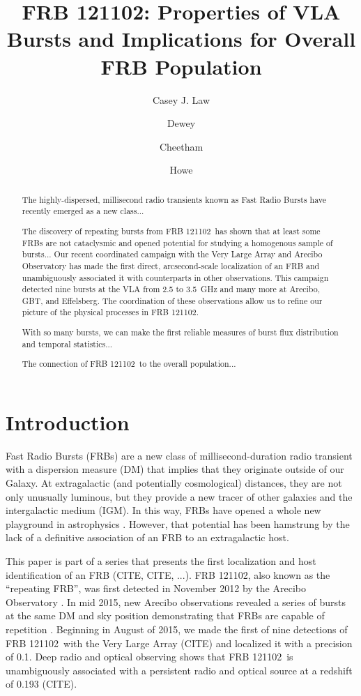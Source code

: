 \documentclass{emulateapj}
\newcommand{\frb}{FRB 121102}
\begin{document}
\title{\frb: Properties of VLA Bursts and Implications for Overall FRB Population}
\shorttitle{\frb\ Burst Properties}

\author{Casey J. Law}
\author{Dewey}
\author{Cheetham}\author{Howe}

\begin{abstract}
The highly-dispersed, millisecond radio transients known as Fast Radio Bursts have recently emerged as a new class...

The discovery of repeating bursts from \frb\ has shown that at least some FRBs are not cataclysmic and opened potential for studying a homogenous sample of bursts...
Our recent coordinated campaign with the Very Large Array and Arecibo Observatory has made the first direct, arcsecond-scale localization of an FRB and unambiguously associated it with counterparts in other observations. This campaign detected nine bursts at the VLA from 2.5 to 3.5~GHz and many more at Arecibo, GBT, and Effelsberg. The coordination of these observations allow us to refine our picture of the physical processes in \frb.

With so many bursts, we can make the first reliable measures of burst flux distribution and temporal statistics...

The connection of \frb\ to the overall population...

\end{abstract}

\section{Introduction}
Fast Radio Bursts (FRBs) are a new class of millisecond-duration radio transient with a dispersion measure (DM) that implies that they originate outside of our Galaxy. At extragalactic (and potentially cosmological) distances, they are not only unusually luminous, but they provide a new tracer of other galaxies and the intergalactic medium (IGM). In this way, FRBs have opened a whole new playground in astrophysics \citep[e.g.,][]{2014A&A...562A.137F, 2014ApJ...780L..33M, 2016MNRAS.457..232C}. However, that potential has been hamstrung by the lack of a definitive association of an FRB to an extragalactic host.

This paper is part of a series that presents the first localization and host identification of an FRB (CITE, CITE, ...). \frb, also known as the ``repeating FRB'', was first detected in November 2012 by the Arecibo Observatory \citep{2014ApJ...790..101S}. In mid 2015, new Arecibo observations revealed a series of bursts at the same DM and sky position demonstrating that FRBs are capable of repetition \citep{2016Natur.531..202S}. Beginning in August of 2015, we made the first of nine detections of \frb\ with the Very Large Array (CITE) and localized it with a precision of 0.1\arcsec. Deep radio and optical observing shows that \frb\ is unambiguously associated with a persistent radio and optical source at a redshift of 0.193 (CITE).
\end{document}
